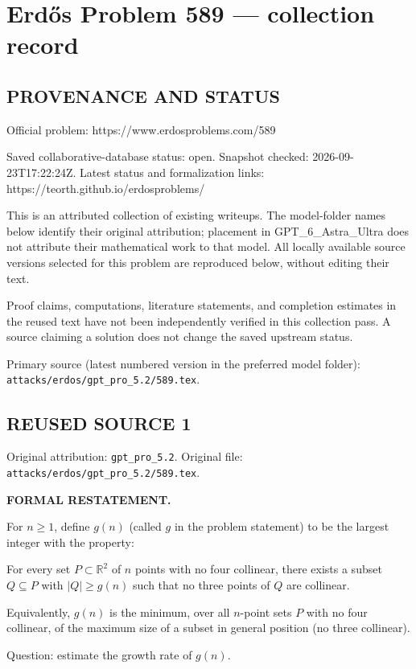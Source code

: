 \section*{Erd\H{o}s Problem 589 --- collection record}

\subsection*{PROVENANCE AND STATUS}
Official problem: https://www.erdosproblems.com/589

Saved collaborative-database status: open.
Snapshot checked: 2026-09-23T17:22:24Z.
Latest status and formalization links: https://teorth.github.io/erdosproblems/

This is an attributed collection of existing writeups. The model-folder names below identify their original attribution; placement in GPT\_6\_Astra\_Ultra does not attribute their mathematical work to that model. All locally available source versions selected for this problem are reproduced below, without editing their text.

Proof claims, computations, literature statements, and completion estimates in the reused text have not been independently verified in this collection pass. A source claiming a solution does not change the saved upstream status.

Primary source (latest numbered version in the preferred model folder): \texttt{attacks/erdos/gpt\_pro\_5.2/589.tex}.

\subsection*{REUSED SOURCE 1}
Original attribution: \texttt{gpt\_pro\_5.2}.
Original file: \texttt{attacks/erdos/gpt\_pro\_5.2/589.tex}.


\noindent\textbf{FORMAL RESTATEMENT.}

For $n\ge 1$, define $g(n)$ (called $g$ in the problem statement) to be the largest integer with the property:

For every set $P\subset\mathbb{R}^2$ of $n$ points with no four collinear, there exists a subset $Q\subseteq P$ with $|Q|\ge g(n)$ such that no three points of $Q$ are collinear.

Equivalently, $g(n)$ is the minimum, over all $n$-point sets $P$ with no four collinear, of the maximum size of a subset in general position (no three collinear).

Question: estimate the growth rate of $g(n)$.

